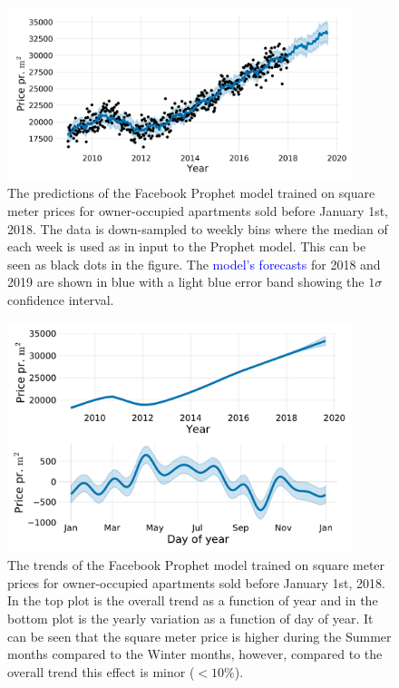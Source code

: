 \begin{figure}
  \includegraphics[draft=false, width=0.9\textwidth, trim=15 15 15 15, clip]{figures/housing/Ejerlejlighed_v18_cut_all_Ncols_all_prophet_forecast.png}
  \caption[Prophet Forecast for Apartments]
          {The predictions of the Facebook Prophet model trained on square meter prices for owner-occupied apartments sold before January 1st, 2018. The data is down-sampled to weekly bins where the median of each week is used as in input to the Prophet model. This can be seen as black dots in the figure. The \textcolor{blue}{model's forecasts} for 2018 and 2019 are shown in blue with a light blue \textcolor{light-blue}{error band} showing the $1\sigma$ confidence interval.
          }
  \label{fig:h:prophet_forecast}
\end{figure}

\begin{figure}
  \includegraphics[draft=false, width=0.9\textwidth, trim=15 15 15 15, clip]{figures/housing/Ejerlejlighed_v18_cut_all_Ncols_all_prophet_trends.pdf}
  \caption[Prophet Trends]
          {The trends of the Facebook Prophet model trained on square meter prices for owner-occupied apartments sold before January 1st, 2018. In the top plot is the overall trend as a function of year and in the bottom plot is the yearly variation as a function of day of year. It can be seen that the square meter price is higher during the Summer months compared to the Winter months, however, compared to the overall trend this effect is minor ($<10\%$). 
          }
  \label{fig:h:prophet_trends}
\end{figure}

